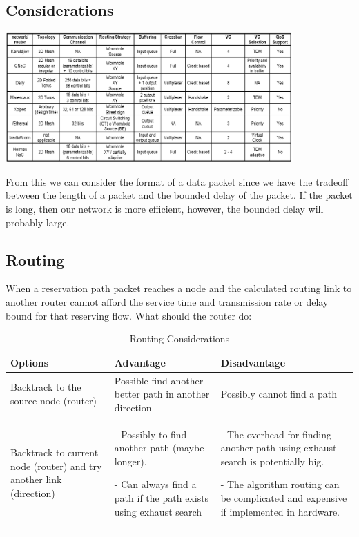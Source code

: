 \documentclass[10pt]{article}
\begin{document}
\subsection{Considerations}
\includegraphics[width=11cm]{pics/OtherArcs.png}

From this we can consider the format of a data packet since we have the 
tradeoff between the length of a packet and the bounded delay of the packet. 
If the packet is long, then our network is more efficient, however, the bounded 
delay will probably large.
\subsection{Routing}
When a reservation path packet reaches a node and the calculated routing link 
to another router cannot afford the service time and transmission rate or delay 
bound for that reserving flow. What should the router do:

\begin{table}[h]
\begin{center}
  \begin{tabular}{ | p{3cm} | p{4cm} | p{4cm} |}
    \hline
	Options & Advantage & Disadvantage \\ \hline
	Backtrack to the source node (router) & 
	Possible find another better path in another direction &
	Possibly cannot find a path \\ \hline
	Backtrack to current node (router) and try another link (direction) &
	- Possibly to find another path (maybe longer).  

	- Can always find a path if the path exists using exhaust search	&
	- The overhead for finding another path using exhaust search is potentially  big.

	- The algorithm routing can be complicated and expensive if implemented in hardware. \\
    \hline
  \end{tabular}
\end{center}
\caption{Routing Considerations}
\label{table:RoutingConsiderations}
\end{table}
\end{document}
